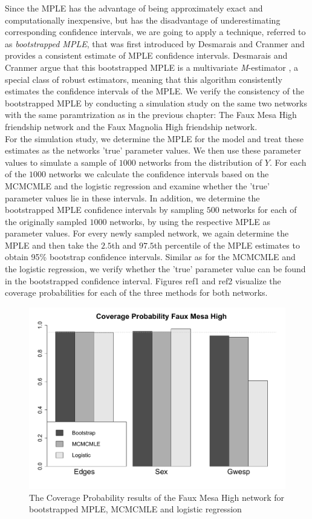 \documentclass[headsepline=true, abstracton]{scrartcl}
\begin{document}
Since the MPLE has the advantage of being approximately exact and computationally inexpensive, but has the disadvantage of underestimating corresponding confidence intervals, we are going to apply a technique, referred to as \textit{bootstrapped MPLE}, that was first introduced by Desmarais and Cranmer \cite{Desmarais.2012} and provides a consistent estimate of MPLE confidence intervals. Desmarais and Cranmer argue that this bootstrapped MPLE is a multivariate \textit{M}-estimator \cite{Huber1981}, a special class of robust estimators, meaning that this algorithm consistently estimates the confidence intervals of the MPLE.
We verify the consistency of the bootstrapped MPLE by conducting a simulation study on the same two networks with the same paramtrization as in the previous chapter: The Faux Mesa High friendship network and the Faux Magnolia High friendship network. \\[0.3cm]
For the simulation study, we determine the MPLE for the model and treat these estimates as the networks 'true' parameter values. We then use these parameter values to simulate a sample of $1000$ networks from the distribution of $Y$. For each of the $1000$ networks we calculate the confidence intervals based on the MCMCMLE and the logistic regression and examine whether the 'true' parameter values lie in these intervals. In addition, we determine the bootstrapped MPLE confidence intervals by sampling $500$ networks for each of the originally sampled $1000$ networks, by using the respective MPLE as parameter values. For every newly sampled network, we again determine the MPLE and then take the $2.5$th and $97.5$th percentile of the MPLE estimates to obtain 95\% bootstrap confidence intervals. Similar as for the MCMCMLE and the logistic regression, we verify whether the 'true' parameter value can be found in the bootstrapped confidence interval. Figures ref1 and ref2 visualize the coverage probabilities for each of the three methods for both networks.

\begin{figure}[h]
\begin{center}
\includegraphics[scale=.4]{Coverage_faux_mesa_high}
\caption{The Coverage Probability results of the Faux Mesa High network for bootstrapped MPLE, MCMCMLE and logistic regression }
\label{rmse}
\end{center}
\end{figure}
\end{document}
